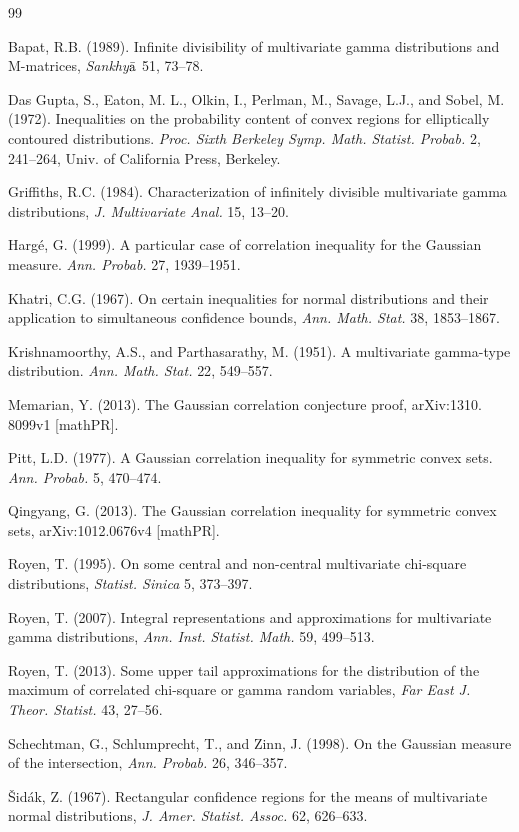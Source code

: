 \documentclass[12pt,twoside]{article}
\numberwithin{equation}{section}
\theoremstyle{plain}
\begin{document}

\begin{thebibliography}{99}

Bapat, R.B. (1989). Infinite divisibility of multivariate gamma distributions and M-matrices, {\it Sankhy$\bar{\rm{a}}$} 51, 73--78.

Das Gupta, S., Eaton, M. L., Olkin, I., Perlman, M., Savage, L.J., and Sobel, M. (1972).  Inequalities on the probability content of convex regions for elliptically contoured distributions.  {\sl Proc. Sixth Berkeley Symp. Math. Statist. Probab.} 2, 241--264, Univ. of California Press, Berkeley.

Griffiths, R.C. (1984). Characterization of infinitely divisible multivariate gamma distributions, {\it J. Multivariate Anal.} 15, 13--20.

Harg\'e, G. (1999).  A particular case of correlation inequality for the Gaussian measure.  {\it Ann. Probab.} { 27}, 1939--1951.

Khatri, C.G. (1967). On certain inequalities for normal distributions and their application to simultaneous confidence bounds, {\it Ann. Math. Stat.} 38, 1853--1867.

Krishnamoorthy, A.S., and Parthasarathy, M. (1951).  A multivariate gamma-type distribution.  {\it  Ann. Math. Stat.} { 22}, 549--557.

Memarian, Y. (2013). The Gaussian correlation conjecture proof, arXiv:1310. 8099v1 [mathPR].

Pitt, L.D. (1977).  A Gaussian correlation inequality for symmetric convex sets. {\it Ann. Probab.} { 5}, 470--474.

Qingyang, G. (2013). The Gaussian correlation inequality for symmetric convex sets, arXiv:1012.0676v4 [mathPR].

Royen, T. (1995). On some central and non-central multivariate chi-square distributions, {\it Statist. Sinica} 5, 373--397.

Royen, T. (2007). Integral representations and approximations for multivariate gamma distributions, {\it Ann. Inst. Statist. Math.} 59, 499--513.

Royen, T. (2013). Some upper tail approximations for the distribution of the maximum of correlated chi-square or gamma random variables, {\it Far East J. Theor. Statist.} 43, 27--56.

Schechtman, G., Schlumprecht, T., and Zinn, J. (1998).  On the Gaussian measure of the intersection, {\it Ann. Probab.} { 26}, 346--357.

\v Sid\'ak, Z. (1967).  Rectangular confidence regions for the means of multivariate normal distributions, {\it J. Amer. Statist. Assoc.} 62, 626--633.
\end{thebibliography}
\end{document}
